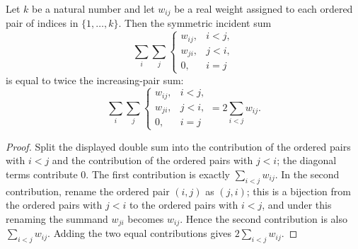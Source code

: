 \begin{helper}
Let $k$ be a natural number and let $w_{ij}$ be a real weight assigned to
each ordered pair of indices in $\{1,\ldots,k\}$.  Then the symmetric
incident sum
\[
\sum_i\sum_j
\begin{cases}
w_{ij},& i<j,\\
w_{ji},& j<i,\\
0,& i=j
\end{cases}
\]
is equal to twice the increasing-pair sum:
\[
\sum_i\sum_j
\begin{cases}
w_{ij},& i<j,\\
w_{ji},& j<i,\\
0,& i=j
\end{cases}
=
2\sum_{i<j}w_{ij}.
\]
\end{helper}
\begin{proof}
Split the displayed double sum into the contribution of the ordered pairs
with $i<j$ and the contribution of the ordered pairs with $j<i$; the diagonal
terms contribute $0$.  The first contribution is exactly
$\sum_{i<j}w_{ij}$.  In the second contribution, rename the ordered pair
$(i,j)$ as $(j,i)$; this is a bijection from the ordered pairs with $j<i$ to
the ordered pairs with $i<j$, and under this renaming the summand $w_{ji}$
becomes $w_{ij}$.  Hence the second contribution is also
$\sum_{i<j}w_{ij}$.  Adding the two equal contributions gives
$2\sum_{i<j}w_{ij}$.
\end{proof}
